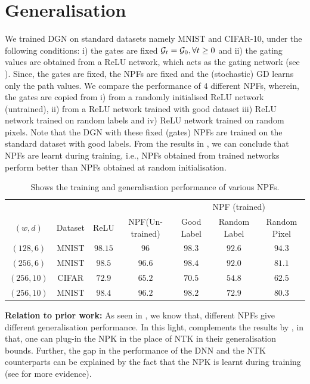 \section{Generalisation}\label{sec:generalisation}
We trained DGN on standard datasets namely MNIST and CIFAR-10, under the following conditions: i) the gates are fixed $\mathcal{G}_t=\mathcal{G}_0,\forall t\geq 0$ and ii) the gating values are obtained from a ReLU network, which acts as the gating network (see ). Since, the gates are fixed, the NPFs are fixed and the (stochastic) GD learns only the path values. We compare the performance of $4$ different NPFs, wherein, the gates are copied from i) from a randomly initialised ReLU network (untrained), ii) from a ReLU network trained with good dataset iii) ReLU network trained on random labels and iv) ReLU network trained on random pixels. Note that the DGN with these fixed (gates) NPFs are trained on the standard dataset with good labels. From the results in , we can conclude that NPFs are learnt during training, i.e., NPFs obtained from trained networks perform better than NPFs obtained at random initialisation.\\
\begin{table}[!b]
\begin{tabular}{|c|c|c|c|c|c|c|}\hline
&&&&\multicolumn{3}{c|}{NPF (trained)}\\\cline{5-7}
$(w,d)$	&Dataset		&ReLU		&NPF(Un-trained) 		&Good Label		&Random Label 	&Random Pixel\\\hline
$(128,6)$	& MNIST 		& $98.15$ 		&$96$ 		&$98.3$		&$92.6$			&$94.3$\\\hline
$(256,6)$	& MNIST 		& $98.5$ 		&$96.6$ 		&$98.4$		&$92.0$			&$81.1$\\\hline
$(256,10)$	& CIFAR 		& $72.9$ 		&$65.2$ 		&$70.5$		&$54.8$			&$62.5$\\\hline
$(256,10)$	& MNIST 		& $98.4$ 		&$96.2$ 		&$98.2$		&$72.9$			&$80.3$\\\hline
\end{tabular}
\caption{Shows the training and generalisation performance of various NPFs.}
\label{tb:npfs}
\end{table}
\textbf{Relation to prior work:} As seen in , we know that, different NPFs give different generalisation performance. In this light,  complements the results by \cite{arora2019exact,cao2019generalization}, in that, one can plug-in the NPK in the place of NTK in their generalisation bounds. Further, the gap in the performance of the DNN and the NTK counterparts can be explained by the fact that the NPK is learnt during training (see  for more evidence).\\

